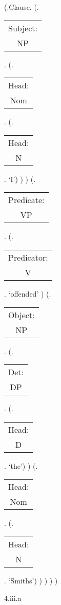 \documentclass[12pt,letterpaper]{article}
\begin{document}
		\begin{figure}
	\begin{center}
		\begin{parsetree}
			(.Clause.
			(.\begin{tabular}{c}Subject:\\NP\end{tabular}.
			(.\begin{tabular}{c}Head:\\Nom\end{tabular}.
			(.\begin{tabular}{c}Head:\\N\end{tabular}. `I')
			)
			)
			(.\begin{tabular}{c}Predicate:\\VP\end{tabular}.
			(.\begin{tabular}{c}Predicator:\\V\end{tabular}.    `offended' )
			(.\begin{tabular}{c}Object:\\NP\end{tabular}.
			(.\begin{tabular}{c}Det:\\DP\end{tabular}.
			(.\begin{tabular}{c}Head:\\D\end{tabular}. `the')
			)
			(.\begin{tabular}{c}Head:\\Nom\end{tabular}.
			(.\begin{tabular}{c}Head:\\N\end{tabular}. `Smiths')
			)
			)
			)
			)
			
			\hfill \break\hfill \break
		\end{parsetree}
		4.iii.a
	\end{center}
\end{figure}
\end{document}
